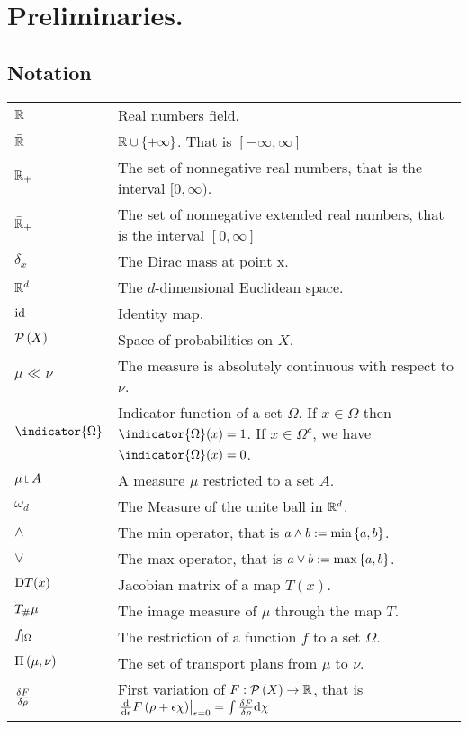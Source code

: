 \chapter{Preliminaries.}
\section{Notation}
\begin{tabular}{ l l }
	$\mathbb{R}$ & Real numbers field. \\ 
	$\bar{\mathbb{R}}$ & $ \mathbb{R} \cup \left\lbrace +\infty \right\rbrace$. That is $[-\infty, \infty]$ \\
	$\mathbb{R}_+ $ & The set of nonnegative real numbers, that is the interval $[0, \infty)$.\\
	$\bar{\mathbb{R}}_+$ & The set of nonnegative extended real numbers, that is the interval $[0, \infty]$\\
	$\delta_x$ & The Dirac mass at point x. \\
	$\mathbb{R}^d $ & The $d$-dimensional Euclidean space.\\
	$\mathrm{id}$ & Identity map.\\
	$\mathcal{P}\left( X \right)$ & Space of probabilities on $X$. \\	
	$\mu \ll\nu$ & The measure is absolutely continuous with respect to $\nu$. \\
	$\indicator{\Omega} $ & Indicator function of a set $\Omega$. If $x\in \Omega$ then $\indicator{\Omega}(x)=1$. If $x\in \Omega^c$, we have $\indicator{\Omega}(x)=0$.\\
	$\mu \measurerestr A$ & A measure $\mu$ restricted to a set $A$.\\
	$\omega_d$ & The Measure of the unite ball in $\mathbb{R}^d$. \\
	$\wedge$ & The min operator, that is $a\wedge b:=\min\left\lbrace a,b \right\rbrace$. \\
	$\vee$ & The max operator, that is $a\vee b:=\max\left\lbrace a,b \right\rbrace$. \\
	$\mathrm{D} T(x)$ & Jacobian matrix of a map $T(x)$. \\
	$T_\# \mu$ &  The image measure of $\mu$ through the map $T$.\\
	${f}_{\left| \Omega \right.}$ & The restriction of a function $f$ to a set $\Omega$. \\
	$\Pi\left(\mu, \nu\right)$ & The set of transport plans from $\mu$ to $\nu$.\\
	$\frac{\delta F}{\delta \rho}$ &  First variation of $F:\mathcal{P}\left( X \right) \rightarrow \mathbb{R}$, that is $\left.\frac{\mathrm{d}}{\mathrm{d}\epsilon}F\left(\rho +\epsilon\chi\right)\right|_{\epsilon=0}=\int\frac{\delta F}{\delta \rho}\mathrm{d}\chi$\\

\end{tabular}
